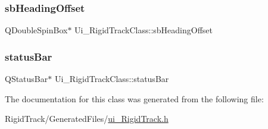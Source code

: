\subsubsection{\texorpdfstring{sb\+Heading\+Offset}{sbHeadingOffset}}
{\footnotesize\ttfamily Q\+Double\+Spin\+Box$\ast$ Ui\+\_\+\+Rigid\+Track\+Class\+::sb\+Heading\+Offset}

\mbox{\label{class_ui___rigid_track_class_ac1ced4ae725bc0095307704d5d4fc4f2}} 
\subsubsection{\texorpdfstring{status\+Bar}{statusBar}}
{\footnotesize\ttfamily Q\+Status\+Bar$\ast$ Ui\+\_\+\+Rigid\+Track\+Class\+::status\+Bar}



The documentation for this class was generated from the following file\+:\begin{DoxyCompactItemize}
\item 
Rigid\+Track/\+Generated\+Files/\hyperlink{ui___rigid_track_8h}{ui\+\_\+\+Rigid\+Track.\+h}\end{DoxyCompactItemize}
